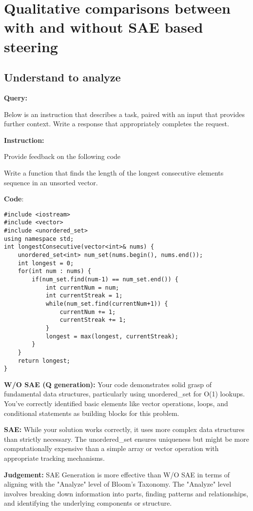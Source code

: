 \medskip
\section{Qualitative comparisons between with and without SAE based steering }

\label{sec:Qgeneration}
\subsection*{Understand to analyze}


\textbf{Query:}

Below is an instruction that describes a task, paired with an input that provides further context. Write a response that appropriately completes the request.\par
\textbf{Instruction:}\par
Provide feedback on the following code \par
Write a function that finds the length of the longest consecutive elements sequence in an unsorted vector.\par

\textbf{Code}:
\begin{lstlisting}
#include <iostream>
#include <vector>
#include <unordered_set>
using namespace std;
int longestConsecutive(vector<int>& nums) {
    unordered_set<int> num_set(nums.begin(), nums.end());
    int longest = 0;
    for(int num : nums) {
        if(num_set.find(num-1) == num_set.end()) {
            int currentNum = num;
            int currentStreak = 1;
            while(num_set.find(currentNum+1)) { 
                currentNum += 1;
                currentStreak += 1;
            }
            longest = max(longest, currentStreak);
        }
    }
    return longest;
}
\end{lstlisting}
\textbf{W/O SAE (Q generation):} Your code demonstrates solid grasp of fundamental data structures, particularly using unordered\_set for O(1) lookups. You've correctly identified basic elements like vector operations, loops, and conditional statements as building blocks for this problem.\par

\textbf{SAE:} While your solution works correctly, it uses more complex data structures than strictly necessary. The unordered\_set ensures uniqueness but might be more computationally expensive than a simple array or vector operation with appropriate tracking mechanisms.\par
\textbf{Judgement:} SAE Generation  is more effective than W/O SAE in terms of aligning with the "Analyze" level of Bloom's Taxonomy. The "Analyze" level involves breaking down information into parts, finding patterns and relationships, and identifying the underlying components or structure.


